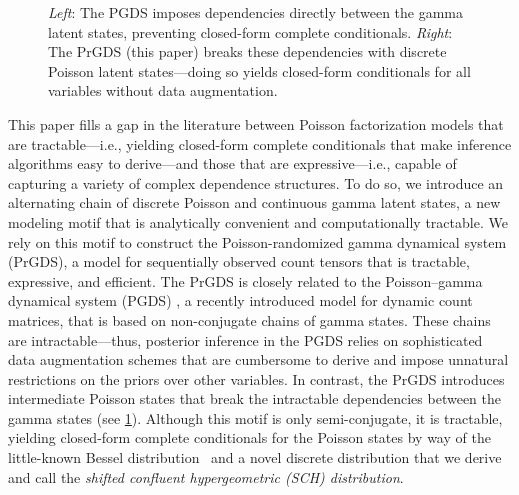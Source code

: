 \documentclass{article}
\begin{document}
\begin{figure}[t]
\centering
{}\hfill
%
\caption{\label{fig:comparison} \footnotesize \emph{Left}: The PGDS imposes dependencies directly between the gamma latent states, preventing closed-form complete conditionals. \emph{Right}: The PrGDS (this paper) breaks these dependencies with discrete Poisson latent states---doing so yields closed-form conditionals for all variables without data augmentation.~}%
\end{figure}

This paper fills a gap in the literature between Poisson factorization models that are tractable---i.e., yielding closed-form complete conditionals that make inference algorithms easy to derive---and those that are expressive---i.e., capable of capturing a variety of complex dependence structures. To do so, we introduce an alternating chain of discrete Poisson and continuous gamma latent states, a new modeling motif that is analytically convenient and computationally tractable. We rely on this motif to construct the Poisson-randomized gamma dynamical system (PrGDS), a model for sequentially observed count tensors that is tractable, expressive, and efficient. The PrGDS is closely related to the Poisson--gamma dynamical system (PGDS) \cite{schein2016poisson}, a recently introduced model for dynamic count matrices, that is based on non-conjugate chains of gamma states. These chains are intractable---thus, posterior inference in the PGDS relies on sophisticated data augmentation schemes that are cumbersome to derive and impose unnatural restrictions on the priors over other variables. In contrast, the PrGDS introduces intermediate Poisson states that break the intractable dependencies between the gamma states (see \cref{fig:comparison}). Although this motif is only semi-conjugate, it is tractable, yielding closed-form complete conditionals for the Poisson states by way of the little-known Bessel distribution~\cite{yuan2000bessel} and a novel discrete distribution that we derive and call the \emph{shifted confluent hypergeometric (SCH) distribution}.~
\end{document}
